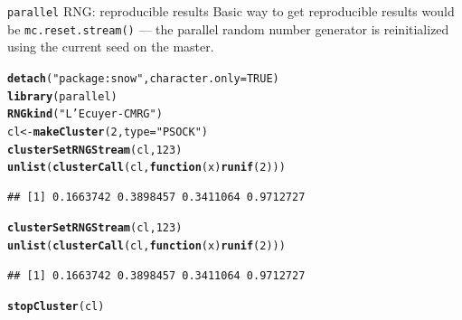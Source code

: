 \documentclass[aspectratio=169]{beamer}\usepackage[]{graphicx}\usepackage[]{color}
\makeatletter
\newcommand{\hlnum}[1]{\textcolor[rgb]{0.686,0.059,0.569}{#1}}%
\newcommand{\hlstr}[1]{\textcolor[rgb]{0.192,0.494,0.8}{#1}}%
\newcommand{\hlstd}[1]{\textcolor[rgb]{0.345,0.345,0.345}{#1}}%
\newcommand{\hlkwa}[1]{\textcolor[rgb]{0.161,0.373,0.58}{\textbf{#1}}}%
\newcommand{\hlkwb}[1]{\textcolor[rgb]{0.69,0.353,0.396}{#1}}%
\newcommand{\hlkwc}[1]{\textcolor[rgb]{0.333,0.667,0.333}{#1}}%
\newcommand{\hlkwd}[1]{\textcolor[rgb]{0.737,0.353,0.396}{\textbf{#1}}}%
\newenvironment{kframe}{%
 \def\at@end@of@kframe{}%
 \ifinner\ifhmode%
  \def\at@end@of@kframe{\end{minipage}}%
  \begin{minipage}{\columnwidth}%
 \fi\fi%
 \def\FrameCommand##1{\hskip\@totalleftmargin \hskip-\fboxsep
 \colorbox{shadecolor}{##1}\hskip-\fboxsep
     \hskip-\linewidth \hskip-\@totalleftmargin \hskip\columnwidth}%
 \MakeFramed {\advance\hsize-\width
   \@totalleftmargin\z@ \linewidth\hsize
   \@setminipage}}%
 {\par\unskip\endMakeFramed%
 \at@end@of@kframe}
\newenvironment{knitrout}{}{} %
\makeatother
\begin{document}
\begin{frame}[fragile]{\texttt{parallel} RNG: reproducible results}
    Basic way to get reproducible results would be \texttt{mc.reset.stream()} --- the parallel random number generator is reinitialized using the current seed
    on the master.

\begin{knitrout}\scriptsize
{}\color{fgcolor}\begin{kframe}
\begin{alltt}
\hlkwd{detach}\hlstd{(}\hlstr{"package:snow"}\hlstd{,} \hlkwc{character.only}\hlstd{=}\hlnum{TRUE}\hlstd{)}
\hlkwd{library}\hlstd{(parallel)}
\hlkwd{RNGkind}\hlstd{(}\hlstr{"L'Ecuyer-CMRG"}\hlstd{)}
\hlstd{cl} \hlkwb{<-} \hlkwd{makeCluster}\hlstd{(}\hlnum{2}\hlstd{,} \hlkwc{type}\hlstd{=}\hlstr{"PSOCK"}\hlstd{)}
\hlkwd{clusterSetRNGStream}\hlstd{(cl,} \hlnum{123}\hlstd{)}
\hlkwd{unlist}\hlstd{(}\hlkwd{clusterCall}\hlstd{(cl,} \hlkwa{function}\hlstd{(}\hlkwc{x}\hlstd{)} \hlkwd{runif}\hlstd{(}\hlnum{2}\hlstd{)))}
\end{alltt}
\begin{verbatim}
## [1] 0.1663742 0.3898457 0.3411064 0.9712727
\end{verbatim}
\begin{alltt}
\hlkwd{clusterSetRNGStream}\hlstd{(cl,} \hlnum{123}\hlstd{)}
\hlkwd{unlist}\hlstd{(}\hlkwd{clusterCall}\hlstd{(cl,} \hlkwa{function}\hlstd{(}\hlkwc{x}\hlstd{)} \hlkwd{runif}\hlstd{(}\hlnum{2}\hlstd{)))}
\end{alltt}
\begin{verbatim}
## [1] 0.1663742 0.3898457 0.3411064 0.9712727
\end{verbatim}
\begin{alltt}
\hlkwd{stopCluster}\hlstd{(cl)}
\end{alltt}
\end{kframe}
\end{knitrout}
\end{frame}
\end{document}

